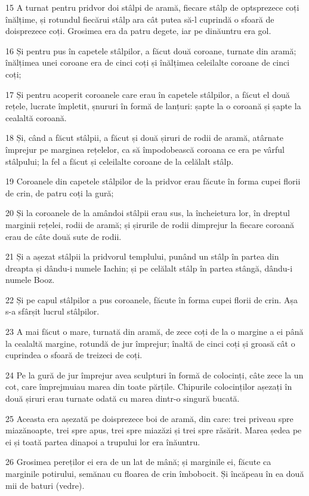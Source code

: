 \par 15 A turnat pentru pridvor doi stâlpi de aramă, fiecare stâlp de optsprezece coți înălțime, și rotundul fiecărui stâlp ara cât putea să-l cuprindă o sfoară de doisprezece coți. Grosimea era da patru degete, iar pe dinăuntru era gol.
\par 16 Și pentru pus în capetele stâlpilor, a făcut două coroane, turnate din aramă; înălțimea unei coroane era de cinci coți și înălțimea celeilalte coroane de cinci coți;
\par 17 Și pentru acoperit coroanele care erau în capetele stâlpilor, a făcut el două rețele, lucrate împletit, șnururi în formă de lanțuri: șapte la o coroană și șapte la cealaltă coroană.
\par 18 Și, când a făcut stâlpii, a făcut și două șiruri de rodii de aramă, atârnate împrejur pe marginea rețelelor, ca să împodobească coroana ce era pe vârful stâlpului; la fel a făcut și celeilalte coroane de la celălalt stâlp.
\par 19 Coroanele din capetele stâlpilor de la pridvor erau făcute în forma cupei florii de crin, de patru coți la gură;
\par 20 Și la coroanele de la amândoi stâlpii erau sus, la încheietura lor, în dreptul marginii rețelei, rodii de aramă; și șirurile de rodii dimprejur la fiecare coroană erau de câte două sute de rodii.
\par 21 Și a așezat stâlpii la pridvorul templului, punând un stâlp în partea din dreapta și dându-i numele Iachin; și pe celălalt stâlp în partea stângă, dându-i numele Booz.
\par 22 Și pe capul stâlpilor a pus coroanele, făcute în forma cupei florii de crin. Așa s-a sfârșit lucrul stâlpilor.
\par 23 A mai făcut o mare, turnată din aramă, de zece coți de la o margine a ei până la cealaltă margine, rotundă de jur împrejur; înaltă de cinci coți și groasă cât o cuprindea o sfoară de treizeci de coți.
\par 24 Pe la gură de jur împrejur avea sculpturi în formă de colocinți, câte zece la un cot, care împrejmuiau marea din toate părțile. Chipurile colocinților așezați în două șiruri erau turnate odată cu marea dintr-o singură bucată.
\par 25 Aceasta era așezată pe doisprezece boi de aramă, din care: trei priveau spre miazănoapte, trei spre apus, trei spre miazăzi și trei spre răsărit. Marea ședea pe ei și toată partea dinapoi a trupului lor era înăuntru.
\par 26 Grosimea pereților ei era de un lat de mână; și marginile ei, făcute ca marginile potirului, semănau cu floarea de crin îmbobocit. Și încăpeau în ea două mii de baturi (vedre).

